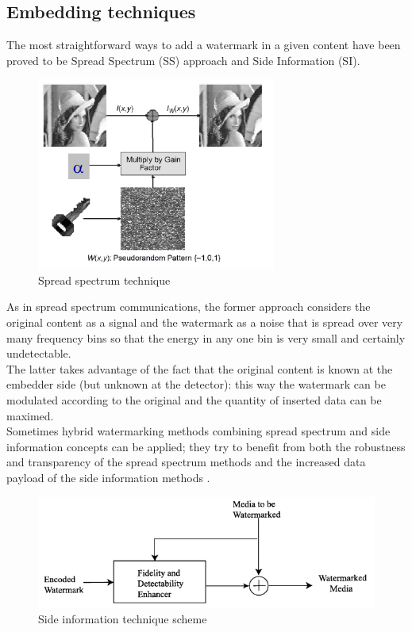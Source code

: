 \subsection{Embedding techniques}
The most straightforward ways to add a watermark in a given content have been proved to be Spread Spectrum (SS) approach and Side Information (SI).\\
\begin{figure}[h!]
\centering
\includegraphics[width=0.7\textwidth]{./img/ss.png}
\caption{\small{Spread spectrum technique}}
\label{fig:ss}
\end{figure}
As in spread spectrum communications, the former approach considers the original content as a signal and the watermark as a noise that is spread over very many frequency bins so that the energy in any one bin is very small and certainly undetectable\cite{COX}\cite{COX1}.\\
The latter takes advantage of the fact that the original content is known at the embedder side (but unknown at the detector): this way the watermark can be modulated  according to the original and the quantity of inserted data can be maximed\cite{COX1,SH, EG, COSTA}.\\

Sometimes hybrid watermarking methods combining spread spectrum and side information concepts can be applied; they try to benefit from both the robustness and transparency of the spread spectrum methods and the increased data payload of the side information methods \cite{QIM}\cite{QIM1}.
\begin{figure}[h!]
\centering
\includegraphics[width=1\textwidth]{./img/si.png}
\caption{\small{Side information technique scheme}}
\label{fig:si}
\end{figure}

